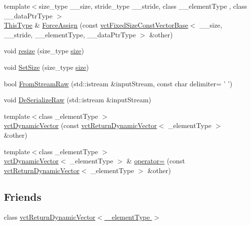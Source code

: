 \begin{DoxyCompactItemize}
\item 
{\footnotesize template$<$size\-\_\-type \-\_\-\-\_\-size, stride\-\_\-type \-\_\-\-\_\-stride, class \-\_\-\-\_\-element\-Type , class \-\_\-\-\_\-data\-Ptr\-Type $>$ }\\\hyperlink{classvct_dynamic_const_vector_base_a39da273523717f678f54d3321ebca3dd}{This\-Type} \& \hyperlink{classvct_dynamic_vector_a0369d655d813f1cdba479b21cd2449f9}{Force\-Assign} (const \hyperlink{classvct_fixed_size_const_vector_base}{vct\-Fixed\-Size\-Const\-Vector\-Base}$<$ \-\_\-\-\_\-size, \-\_\-\-\_\-stride, \-\_\-\-\_\-element\-Type, \-\_\-\-\_\-data\-Ptr\-Type $>$ \&other)
\item 
void \hyperlink{classvct_dynamic_vector_a12a587a4033a2368c7d903b264c76b11}{resize} (size\-\_\-type \hyperlink{classvct_dynamic_const_vector_base_a79950d8cced7fd4e790d9ac2ca1c43a7}{size})
\item 
void \hyperlink{classvct_dynamic_vector_ad48b540760581f3c6b7beeb19e6220f2}{Set\-Size} (size\-\_\-type \hyperlink{classvct_dynamic_const_vector_base_a79950d8cced7fd4e790d9ac2ca1c43a7}{size})
\item 
bool \hyperlink{classvct_dynamic_vector_a3eaaf7e4a316d8b049157508757e5c66}{From\-Stream\-Raw} (std\-::istream \&input\-Stream, const char delimiter= ' ')
\item 
void \hyperlink{classvct_dynamic_vector_ac0e182cb025b788147fbb209da1ff8c5}{De\-Serialize\-Raw} (std\-::istream \&input\-Stream)
\item 
{\footnotesize template$<$class \-\_\-element\-Type $>$ }\\\hyperlink{classvct_dynamic_vector_a71dd4898b371e6d4b613e39908cd4c28}{vct\-Dynamic\-Vector} (const \hyperlink{classvct_return_dynamic_vector}{vct\-Return\-Dynamic\-Vector}$<$ \-\_\-element\-Type $>$ \&other)
\item 
{\footnotesize template$<$class \-\_\-element\-Type $>$ }\\\hyperlink{classvct_dynamic_vector}{vct\-Dynamic\-Vector}$<$ \-\_\-element\-Type $>$ \& \hyperlink{classvct_dynamic_vector_a7c7c5f458ab71b68d31ad603caad10b8}{operator=} (const \hyperlink{classvct_return_dynamic_vector}{vct\-Return\-Dynamic\-Vector}$<$ \-\_\-element\-Type $>$ \&other)
\end{DoxyCompactItemize}
\subsection*{Friends}
\begin{DoxyCompactItemize}
\item 
class \hyperlink{classvct_dynamic_vector_adf7a81f9466b24ae64c58cb6be285250}{vct\-Return\-Dynamic\-Vector$<$ \-\_\-element\-Type $>$}
\end{DoxyCompactItemize}
